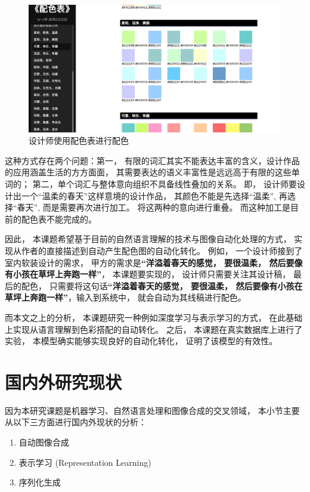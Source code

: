 \begin{figure}[htbp]
    \centering  %
    \includegraphics[width = .55\linewidth]{data/chapter-2/peisebiao.png} %
    \caption{设计师使用配色表进行配色} %
    \label{img:peise} %
\end{figure}

这种方式存在两个问题：第一， 有限的词汇其实不能表达丰富的含义，设计作品的应用涵盖生活的方方面面， 其需要表达的语义丰富性是远远高于有限的这些单词的； 第二，单个词汇与整体意向组织不具备线性叠加的关系。 即， 设计师要设计出一个“温柔的春天”这样意境的设计作品， 其颜色不能是先选择“温柔”, 再选择“春天”, 而是需要再次进行加工。 将这两种的意向进行重叠。 而这种加工是目前的配色表不能完成的。 

因此， 本课题希望基于目前的自然语言理解的技术与图像自动化处理的方式， 实现从作者的直接描述到自动产生配色图的自动化转化。 例如， 一个设计师接到了室内软装设计的需求， 甲方的需求是\textbf{“洋溢着春天的感觉， 要很温柔， 然后要像有小孩在草坪上奔跑一样”}， 本课题要实现的， 设计师只需要关注其设计稿， 最后的配色， 只需要将这句话\textbf{“洋溢着春天的感觉， 要很温柔， 然后要像有小孩在草坪上奔跑一样”}，输入到系统中， 就会自动为其线稿进行配色。 

而本文之上的分析， 本课题研究一种例如深度学习与表示学习的方式， 在此基础上实现从语言理解到色彩搭配的自动转化。 之后， 本课题在真实数据库上进行了实验， 本模型确实能够实现良好的自动化转化， 证明了该模型的有效性。 


\section{国内外研究现状}

因为本研究课题是机器学习、自然语言处理和图像合成的交叉领域， 本小节主要从以下三方面进行国内外现状的分析： 

\begin{enumerate}

	\item 自动图像合成
	\item 表示学习 (Representation Learning)
	\item 序列化生成 
	
\end{enumerate}

